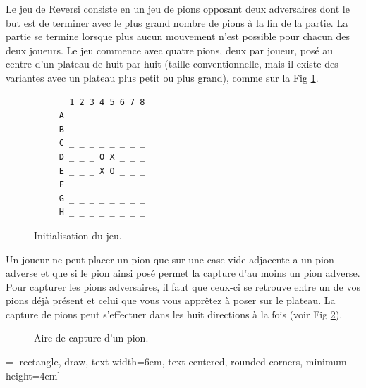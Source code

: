 \documentclass[10pt,a4paper]{article}
\begin{document}
Le jeu de Reversi consiste en un jeu de pions opposant deux adversaires dont le but est de terminer avec le plus grand nombre de pions à la fin de la partie. La partie se termine lorsque plus aucun mouvement n'est possible pour chacun des deux joueurs. Le jeu commence avec quatre pions, deux par joueur, posé au centre d'un plateau de huit par huit (taille conventionnelle, mais il existe des variantes avec un plateau plus petit ou plus grand), comme sur la Fig \ref{fig:début_du_jeu}.
 \begin{figure}[H]    
    \centering
    \begin{BVerbatim}
       1 2 3 4 5 6 7 8
     A _ _ _ _ _ _ _ _
     B _ _ _ _ _ _ _ _
     C _ _ _ _ _ _ _ _
     D _ _ _ O X _ _ _
     E _ _ _ X O _ _ _
     F _ _ _ _ _ _ _ _
     G _ _ _ _ _ _ _ _
     H _ _ _ _ _ _ _ _
    \end{BVerbatim}
    \caption {Initialisation du jeu.\label{fig:début_du_jeu}}
    \end{figure}
Un joueur ne peut placer un pion que sur une case vide adjacente a un pion adverse et que si le pion ainsi posé permet la capture d'au moins un pion adverse. Pour capturer les pions adversaires, il faut que ceux-ci se retrouve entre un de vos pions déjà présent et celui que vous vous apprêtez à poser sur le plateau. La capture de pions peut s'effectuer dans les huit directions à la fois (voir Fig \ref{fig:aire_de_capture}).
 \begin{figure}[H]    
    \centering
{}
    \caption {Aire de capture d'un pion.\label{fig:aire_de_capture}}
 \end{figure}
  = [rectangle, draw, text width=6em, text centered, rounded corners, minimum height=4em]
 
\end{document}
